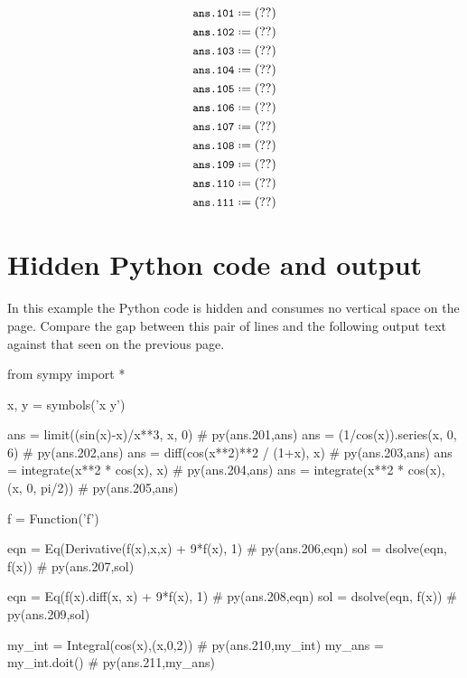 \documentclass[12pt]{pylatex}
\begin{document}
\vspace{-10pt}

\begin{align*}
   &\py*{ans.101}\\
   &\py*{ans.102}\\
   &\py*{ans.103}\\
   &\py*{ans.104}\\
   &\py*{ans.105}\\
   &\py*{ans.106}\\
   &\py*{ans.107}\\
   &\py*{ans.108}\\
   &\py*{ans.109}\\
   &\py*{ans.110}\\
   &\py*{ans.111}
\end{align*}

\clearpage

\section*{Hidden Python code and output}


In this example the Python code is hidden and consumes no vertical space on the page. Compare the gap between this pair of lines and the following output text against that seen on the previous page.

\begin{python}
   from sympy import *

   x, y = symbols('x y')

   ans = limit((sin(x)-x)/x**3, x, 0)               # py(ans.201,ans)
   ans = (1/cos(x)).series(x, 0, 6)                 # py(ans.202,ans)
   ans = diff(cos(x**2)**2 / (1+x), x)              # py(ans.203,ans)
   ans = integrate(x**2 * cos(x), x)                # py(ans.204,ans)
   ans = integrate(x**2 * cos(x), (x, 0, pi/2))     # py(ans.205,ans)

   f = Function('f')

   eqn = Eq(Derivative(f(x),x,x) + 9*f(x), 1)       # py(ans.206,eqn)
   sol = dsolve(eqn, f(x))                          # py(ans.207,sol)

   eqn = Eq(f(x).diff(x, x) + 9*f(x), 1)            # py(ans.208,eqn)
   sol = dsolve(eqn, f(x))                          # py(ans.209,sol)

   my_int = Integral(cos(x),(x,0,2))                # py(ans.210,my_int)
   my_ans = my_int.doit()                           # py(ans.211,my_ans)
\end{python}
\end{document}
